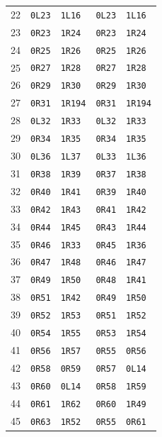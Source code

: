 {\begin{longtable}{rllll}
22 & \texttt{0L23} & \texttt{1L16} & \texttt{0L23} & \texttt{1L16}\\
23 & \texttt{0R23} & \texttt{1R24} & \texttt{0R23} & \texttt{1R24}\\
24 & \texttt{0R25} & \texttt{1R26} & \texttt{0R25} & \texttt{1R26}\\
25 & \texttt{0R27} & \texttt{1R28} & \texttt{0R27} & \texttt{1R28}\\
26 & \texttt{0R29} & \texttt{1R30} & \texttt{0R29} & \texttt{1R30}\\
27 & \texttt{0R31} & \texttt{1R194} & \texttt{0R31} & \texttt{1R194}\\
28 & \texttt{0L32} & \texttt{1R33} & \texttt{0L32} & \texttt{1R33}\\
29 & \texttt{0R34} & \texttt{1R35} & \texttt{0R34} & \texttt{1R35}\\
30 & \texttt{0L36} & \texttt{1L37} & \texttt{0L33} & \texttt{1L36}\\
31 & \texttt{0R38} & \texttt{1R39} & \texttt{0R37} & \texttt{1R38}\\
32 & \texttt{0R40} & \texttt{1R41} & \texttt{0R39} & \texttt{1R40}\\
33 & \texttt{0R42} & \texttt{1R43} & \texttt{0R41} & \texttt{1R42}\\
34 & \texttt{0R44} & \texttt{1R45} & \texttt{0R43} & \texttt{1R44}\\
35 & \texttt{0R46} & \texttt{1R33} & \texttt{0R45} & \texttt{1R36}\\
36 & \texttt{0R47} & \texttt{1R48} & \texttt{0R46} & \texttt{1R47}\\
37 & \texttt{0R49} & \texttt{1R50} & \texttt{0R48} & \texttt{1R41}\\
38 & \texttt{0R51} & \texttt{1R42} & \texttt{0R49} & \texttt{1R50}\\
39 & \texttt{0R52} & \texttt{1R53} & \texttt{0R51} & \texttt{1R52}\\
40 & \texttt{0R54} & \texttt{1R55} & \texttt{0R53} & \texttt{1R54}\\
41 & \texttt{0R56} & \texttt{1R57} & \texttt{0R55} & \texttt{0R56}\\
42 & \texttt{0R58} & \texttt{0R59} & \texttt{0R57} & \texttt{0L14}\\
43 & \texttt{0R60} & \texttt{0L14} & \texttt{0R58} & \texttt{1R59}\\
44 & \texttt{0R61} & \texttt{1R62} & \texttt{0R60} & \texttt{1R49}\\
45 & \texttt{0R63} & \texttt{1R52} & \texttt{0R55} & \texttt{0R61}\\

\end{longtable}}
